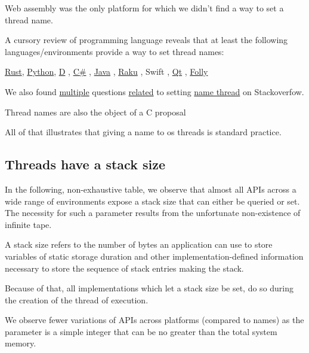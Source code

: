 \documentclass{wg21}
\begin{document}
Web assembly was the only platform for which we didn't find a way to set a thread name.

A cursory review of programming language reveals that at least the following languages/environments provide a way to set thread names:

\href{https://doc.rust-lang.org/std/thread/struct.Builder.html}{Rust}, \href{https://docs.python.org/3/library/threading.html#thread-objects}{Python}, \href{https://dlang.org/phobos/core_thread_osthread.html#.Thread.name}{D} 
, \href{https://docs.microsoft.com/en-us/dotnet/api/system.threading.thread.name?view=netframework-4.8}{C\#}
, \href{https://docs.oracle.com/javase/7/docs/api/java/lang/Thread.html}{Java}
, \href{https://docs.raku.org/type/Thread#method_name}{Raku}
, Swift
, \href{https://doc.qt.io/qt-5/qthread.html#managing-threads}{Qt}
, \href{https://github.com/facebook/folly/blob/master/folly/system/ThreadName.h}{Folly}

We also found \href{https://stackoverflow.com/questions/10121560/stdthread-naming-your-thread}{multiple} questions \href{https://stackoverflow.com/questions/57477053/how-to-set-custom-name-of-this-thread}{related} to setting \href{https://stackoverflow.com/questions/16486937/name-a-thread-created-by-beginthread-in-c}{name thread} 
on Stackoverfow.

Thread names are also the object of a C proposal \cite{N2419}

All of that illustrates that giving a name to os threads is standard practice.


\subsection{Threads have a stack size}

In the following, non-exhaustive table, we observe that almost all APIs across a wide range
of environments expose a stack size that can either be queried or set.
The necessity for such a parameter results from the unfortunate non-existence of infinite tape.

A stack size refers to the number of bytes an application can use to store variables of static storage duration and other implementation-defined information
necessary to store the sequence of stack entries making the stack.

Because of that, all implementations which let a stack size be set, do so during the creation of the thread
of execution.

We observe fewer variations of APIs across platforms (compared to names) as the parameter is a simple integer
that can be no greater than the total system memory.
\end{document}

